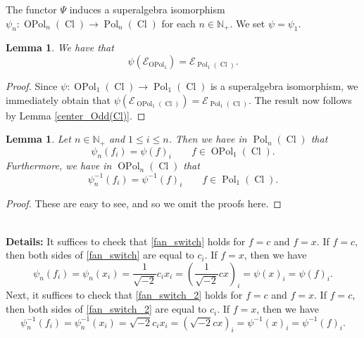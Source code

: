 \documentclass[11pt]{amsart}
\newcommand{\details}[1]{
      \ \\
      {\color{OliveGreen}
        \textbf{Details:} #1
      }
      \\
  }
\newcommand{\details}[1]{}
\newtheorem{lem}[theo]{Lemma}
\theoremstyle{definition}
\numberwithin{equation}{section}
\begin{document}
The functor $ \Psi $ induces a superalgebra isomorphism $ \psi_{n} \colon \operatorname{OPol}_{n}(\operatorname{Cl}) \rightarrow \operatorname{Pol}_{n}(\operatorname{Cl}) $ for each $ n \in \mathbb{N}_{+} $. We set $ \psi = \psi_{1} $.

\begin{lem} \label{Psi(H)}
We have that
\begin{equation}
\psi(\mathcal{E}_{\operatorname{OPol}_{1}}) = \mathcal{E}_{\operatorname{Pol}_{1}(\operatorname{Cl})}.
\end{equation}
\end{lem}

\begin{proof}
Since $ \psi \colon \operatorname{OPol}_{1}(\operatorname{Cl}) \rightarrow \operatorname{Pol}_{1}(\operatorname{Cl}) $ is a superalgebra isomorphism, we immediately obtain that $ \psi(\mathcal{E}_{\operatorname{OPol}_{1}(\operatorname{Cl})}) = \mathcal{E}_{\operatorname{Pol}_{1}(\operatorname{Cl})} $. The result now follows by Lemma \ref{center_Odd(Cl)}.
\end{proof}



\begin{lem}
Let $ n \in \mathbb{N}_{+} $ and $ 1 \leq i \leq n $. Then we have in $ \operatorname{Pol}_{n}(\operatorname{Cl}) $ that
\begin{equation} \label{fan_switch}
\psi_{n}(f_{i}) = \psi(f)_{i} \qquad f \in \operatorname{OPol}_{1}(\operatorname{Cl}).
\end{equation}
Furthermore, we have in $ \operatorname{OPol}_{n}(\operatorname{Cl}) $ that
\begin{equation} \label{fan_switch_2}
\psi_{n}^{-1}(f_{i}) = \psi^{-1}(f)_{i} \qquad f \in \operatorname{Pol}_{1}(\operatorname{Cl}).
\end{equation}
\end{lem}

\begin{proof}
These are easy to see, and so we omit the proofs here.
\end{proof}

\details{It suffices to check that \cref{fan_switch} holds for $ f = c $ and $ f = x $. If $ f = c $, then both sides of \cref{fan_switch} are equal to $ c_{i} $. If $ f = x $, then we have
\begin{equation*}
\psi_{n}(f_{i}) = \psi_{n}(x_{i}) = \frac{1}{\sqrt{-2}}c_{i}x_{i} = \left( \frac{1}{\sqrt{-2}}cx \right)_{i} = \psi(x)_{i}  = \psi(f)_{i}.
\end{equation*}
Next, it suffices to check that \cref{fan_switch_2} holds for $ f = c $ and $ f = x $. If $ f = c $, then both sides of \cref{fan_switch_2} are equal to $ c_{i} $. If $ f = x $, then we have
\begin{equation*}
\psi_{n}^{-1}(f_{i}) = \psi_{n}^{-1}(x_{i}) = \sqrt{-2}c_{i}x_{i} = \left( \sqrt{-2}cx \right)_{i} = \psi^{-1}(x)_{i}  = \psi^{-1}(f)_{i}.
\end{equation*}}
\end{document}
